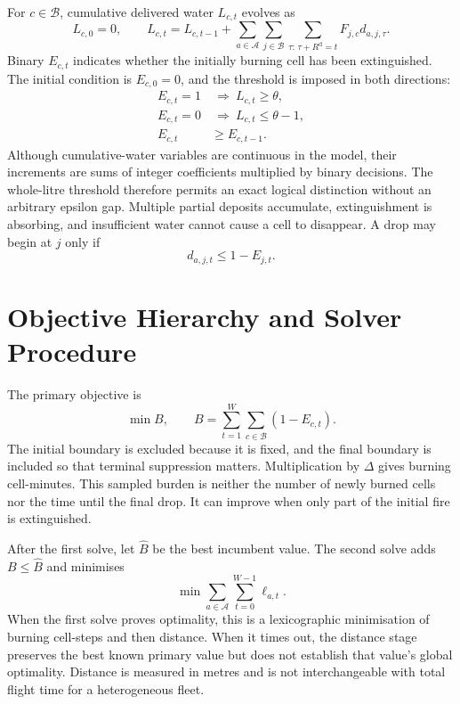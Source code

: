 For $c\in\mathcal{B}$, cumulative delivered water $L_{c,t}$ evolves as
\begin{equation}
    L_{c,0}=0,
    \qquad
    L_{c,t}=L_{c,t-1}
    +\sum_{a\in\mathcal{A}}\sum_{j\in\mathcal{B}}
    \sum_{\tau:\,\tau+R^{\mathrm{d}}=t}F_{j,c}d_{a,j,\tau}.
\end{equation}
Binary $E_{c,t}$ indicates whether the initially burning cell has been extinguished. The initial condition is $E_{c,0}=0$, and the threshold is imposed in both directions:
\begin{align}
    E_{c,t}=1&\ \Longrightarrow\ L_{c,t}\geq\theta,\\
    E_{c,t}=0&\ \Longrightarrow\ L_{c,t}\leq\theta-1,\\
    E_{c,t}&\geq E_{c,t-1}.
\end{align}
Although cumulative-water variables are continuous in the model, their increments are sums of integer coefficients multiplied by binary decisions. The whole-litre threshold therefore permits an exact logical distinction without an arbitrary epsilon gap. Multiple partial deposits accumulate, extinguishment is absorbing, and insufficient water cannot cause a cell to disappear. A drop may begin at $j$ only if
\begin{equation}
    d_{a,j,t}\leq1-E_{j,t}.
\end{equation}

\section{Objective Hierarchy and Solver Procedure}
\label{sec:method-solver}

The primary objective is
\begin{equation}
    \min B,
    \qquad B=\sum_{t=1}^{W}\sum_{c\in\mathcal{B}}(1-E_{c,t}).
    \label{eq:static-primary}
\end{equation}
The initial boundary is excluded because it is fixed, and the final boundary is included so that terminal suppression matters. Multiplication by $\Delta$ gives burning cell-minutes. This sampled burden is neither the number of newly burned cells nor the time until the final drop. It can improve when only part of the initial fire is extinguished.

After the first solve, let $\widehat B$ be the best incumbent value. The second solve adds $B\leq\widehat B$ and minimises
\begin{equation}
    \min\sum_{a\in\mathcal{A}}\sum_{t=0}^{W-1}\ell_{a,t}.
    \label{eq:static-secondary}
\end{equation}
When the first solve proves optimality, this is a lexicographic minimisation of burning cell-steps and then distance. When it times out, the distance stage preserves the best known primary value but does not establish that value's global optimality. Distance is measured in metres and is not interchangeable with total flight time for a heterogeneous fleet.

